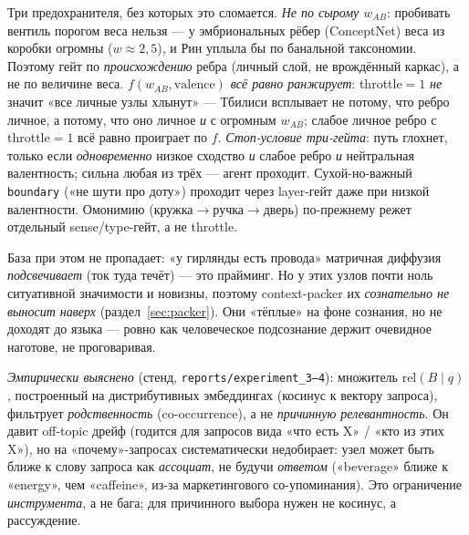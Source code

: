 Три предохранителя, без которых это сломается. \emph{Не по сырому $w_{AB}$}: пробивать
вентиль порогом веса нельзя — у эмбриональных рёбер (ConceptNet) веса из коробки огромны
($w\approx 2{,}5$), и Рин уплыла бы по банальной таксономии. Поэтому гейт по
\emph{происхождению} ребра (личный слой, не врождённый каркас), а не по величине веса.
\emph{$f(w_{AB},\mathrm{valence})$ всё равно ранжирует}: throttle$=1$ \emph{не} значит «все
личные узлы хлынут» — Тбилиси всплывает не потому, что ребро личное, а потому, что оно
личное \emph{и} с огромным $w_{AB}$; слабое личное ребро с throttle$=1$ всё равно проиграет
по $f$. \emph{Стоп-условие три-гейта}: путь глохнет, только если \emph{одновременно}
низкое сходство \emph{и} слабое ребро \emph{и} нейтральная валентность; сильна любая из трёх
— агент проходит. Сухой-но-важный \texttt{boundary} («не шути про доту») проходит через
layer-гейт даже при низкой валентности. Омонимию (кружка$\to$ручка$\to$дверь) по-прежнему
режет отдельный sense/type-гейт, а не throttle.

\begin{intuition}
База при этом не пропадает: «у гирлянды есть провода» матричная диффузия \emph{подсвечивает}
(ток туда течёт) — это прайминг. Но у этих узлов почти ноль ситуативной значимости и
новизны, поэтому context-packer их \emph{сознательно не выносит наверх}
(раздел~\ref{sec:packer}). Они «тёплые» на фоне сознания, но не доходят до языка — ровно как
человеческое подсознание держит очевидное наготове, не проговаривая.
\end{intuition}

\begin{principle}
\emph{Эмпирически выяснено} (стенд, \texttt{reports/experiment\_3--4}): множитель
$\text{rel}(B\mid q)$, построенный на дистрибутивных эмбеддингах (косинус к вектору
запроса), фильтрует \emph{родственность} (co-occurrence), а не \emph{причинную
релевантность}. Он давит off-topic дрейф (годится для запросов вида «что есть X» / «кто
из этих X»), но на «почему»-запросах систематически недобирает: узел может быть ближе к
слову запроса как \emph{ассоциат}, не будучи \emph{ответом} («beverage» ближе к «energy»,
чем «caffeine», из-за маркетингового со-упоминания). Это ограничение \emph{инструмента},
а не бага; для причинного выбора нужен не косинус, а рассуждение.
\end{principle}

